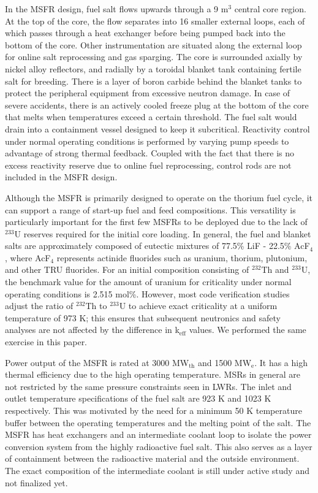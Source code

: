 In the \gls{MSFR} design, fuel salt flows upwards through a 9 m$^3$ central
core region. At the top of the core, the flow separates into 16 smaller
external loops, each of which passes through a heat exchanger before being
pumped back into the bottom of the core. Other instrumentation are situated
along the external loop for online salt reprocessing and gas sparging. The
core is surrounded axially by nickel alloy reflectors, and radially by a
toroidal blanket tank containing fertile salt for breeding. There is a layer
of boron carbide behind the blanket tanks to protect the peripheral equipment
from excessive neutron damage. In case of severe accidents, there is an
actively cooled freeze plug at the bottom of the core that melts when
temperatures exceed a certain threshold. The fuel salt would drain into a
containment vessel designed to keep it subcritical. Reactivity control under
normal operating conditions is performed by varying pump speeds to advantage
of strong thermal feedback. Coupled with the fact that there is no excess
reactivity reserve due to online fuel reprocessing, control rods are not
included in the \gls{MSFR} design.

Although the \gls{MSFR} is primarily designed to operate on the thorium fuel
cycle, it can support a range of start-up fuel and feed compositions. This
versatility is particularly important for the first few \glspl{MSFR} to be
deployed due to the lack of $^{233}$U reserves required for the initial core
loading. In general, the fuel and blanket salts are approximately composed of
eutectic mixtures of 77.5\% LiF - 22.5\% AcF$_4$, where AcF$_4$ represents
actinide fluorides such as uranium, thorium, plutonium, and other \gls{TRU}
fluorides. For an initial composition consisting of $^{232}$Th and $^{233}$U,
the benchmark value for the amount of uranium for criticality under
normal operating conditions is 2.515 mol\%. However, most code verification
studies adjust the ratio of $^{232}$Th to $^{233}$U to achieve exact
criticality at a uniform temperature of 973 K; this ensures that subsequent
neutronics and safety analyses are not affected by the difference in
k$_{\text{eff}}$ values. We performed the same exercise in this paper.

Power output of the \gls{MSFR} is rated at 3000 MW$_{\text{th}}$ and 1500
MW$_{\text{e}}$. It has a high thermal efficiency due to the high operating
temperature. \glspl{MSR} in general are not restricted by the same pressure
constraints seen in \glspl{LWR}. The inlet and outlet temperature
specifications of the fuel salt are 923 K and 1023 K respectively. This was
motivated by the need for a minimum 50 K temperature buffer between the
operating temperatures and the melting point of the salt. The \gls{MSFR} has
heat exchangers and an intermediate coolant loop to isolate the power
conversion system from the highly radioactive fuel salt. This also serves as
a layer of containment between the radioactive material and the outside
environment. The exact composition of the intermediate coolant is still under
active study and not finalized yet.

